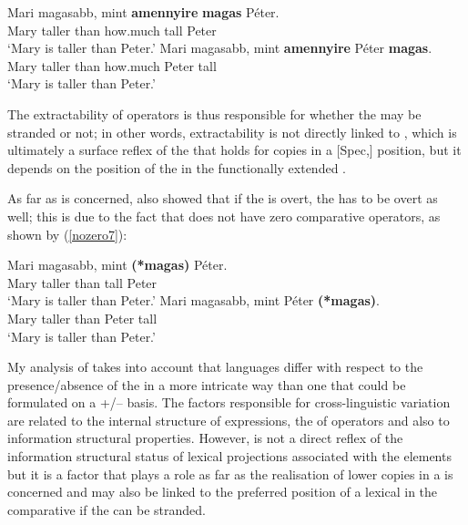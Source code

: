 \ea \label{amennyire7}
\ea \gll Mari	magasabb,	mint \textbf{amennyire} \textbf{magas} Péter.\\
Mary taller	than how.much	tall Peter\\
\glt `Mary is taller than Peter.'
\ex \gll Mari	magasabb,	mint \textbf{amennyire} Péter \textbf{magas}.\\
Mary taller	than	how.much Peter tall\\
\glt `Mary is taller than Peter.'
\z
\z

The extractability of operators is thus responsible for whether the  may be stranded or not; in other words, extractability is not directly linked to , which is ultimately a surface reflex of the  that holds for copies in a [Spec,] position, but it depends on the position of the  in the functionally extended .

As far as  is concerned,  also showed that if the  is overt, the  has to be overt as well; this is due to the fact that  does not have zero comparative operators, as shown by (\ref{nozero7}):

\ea \label{nozero7}
\ea \gll Mari magasabb, mint \textbf{(*magas)} P\'eter.\\
Mary taller than \phantom{\textbf{(*}}tall Peter\\
\glt `Mary is taller than Peter.'
\ex \gll Mari magasabb, mint P\'eter \textbf{(*magas)}.\\
Mary taller than Peter \phantom{\textbf{(*}}tall\\
\glt `Mary is taller than Peter.'
\z
\z

My analysis of  takes into account that languages differ with respect to the presence/absence of the  in a more intricate way than one that could be formulated on a +/-- basis. The factors responsible for cross-linguistic variation are related to the internal structure of  expressions, the  of  operators and also to information structural properties. However,  is not a direct reflex of the information structural status of lexical projections associated with the  elements but it is a factor that plays a role as far as the realisation of lower copies in a  is concerned and may also be linked to the preferred position of a lexical  in the comparative  if the  can be stranded.

